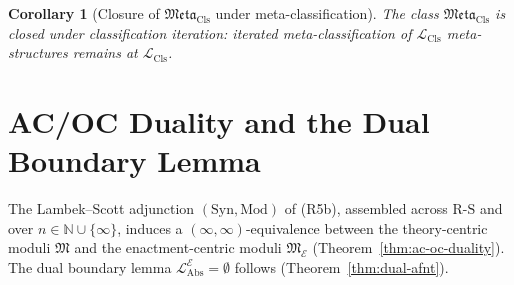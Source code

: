 \documentclass[11pt]{article}
\theoremstyle{plain}
\newtheorem{corollary}[theorem]{Corollary}
\theoremstyle{definition}
\newcommand{\RS}{\mathrm{R\text{-}S}}
\newcommand{\fM}{\mathfrak{M}}
\newcommand{\Meta}{\mathfrak{Meta}}
\newcommand{\LCls}{\mathcal{L}_{\mathrm{Cls}}}
\newcommand{\LAbs}{\mathcal{L}_{\mathrm{Abs}}}
\newcommand{\Syn}{\mathrm{Syn}}
\newcommand{\Mod}{\mathrm{Mod}}
\newcommand{\cE}{\mathcal{E}}
\newcommand{\LAbsE}{\LAbs^{\cE}}
\begin{document}
\begin{corollary}[Closure of $\Meta_{\mathrm{Cls}}$ under meta-classification]\label{cor:meta-closure}
The class $\Meta_{\mathrm{Cls}}$ is closed under classification iteration: iterated meta-classification of $\LCls$ meta-structures remains at $\LCls$.
\end{corollary}

\section{AC/OC Duality and the Dual Boundary Lemma}\label{sec:ac-oc-duality}

The Lambek--Scott adjunction $(\Syn, \Mod)$ of (R5b), assembled across $\RS$ and over $n \in \mathbb{N} \cup \{\infty\}$, induces a $(\infty, \infty)$-equivalence between the theory-centric moduli $\fM$ and the enactment-centric moduli $\fM_\cE$ (Theorem~\ref{thm:ac-oc-duality}). The dual boundary lemma $\LAbsE = \emptyset$ follows (Theorem~\ref{thm:dual-afnt}).
\end{document}
